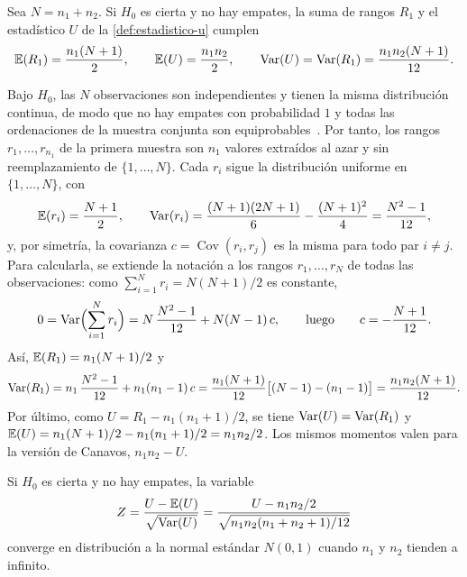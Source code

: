 \begin{proposicion}\label{prop:u-momentos}
Sea $N = n_1 + n_2$. Si $H_0$ es cierta y no hay empates, la suma de rangos $R_1$ y el estadístico $U$ de la \cref{def:estadistico-u} cumplen
\[
  \operatorname{\mathbb{E}}(R_1) = \frac{n_1 (N + 1)}{2}, \qquad
  \operatorname{\mathbb{E}}(U) = \frac{n_1 n_2}{2}, \qquad
  \operatorname{Var}(U) = \operatorname{Var}(R_1) = \frac{n_1 n_2 (N + 1)}{12}.
\]
\end{proposicion}
\begin{demostracion}
Bajo $H_0$, las $N$ observaciones son independientes y tienen la misma distribución continua, de modo que no hay empates con probabilidad $1$ y todas las ordenaciones de la muestra conjunta son equiprobables~\cite[sec.~15.2.1]{canavos2003}. Por tanto, los rangos $r_1, \dots, r_{n_1}$ de la primera muestra son $n_1$ valores extraídos al azar y sin reemplazamiento de $\{1, \dots, N\}$. Cada $r_i$ sigue la distribución uniforme en $\{1, \dots, N\}$, con
\[
  \operatorname{\mathbb{E}}(r_i) = \frac{N + 1}{2}, \qquad
  \operatorname{Var}(r_i) = \frac{(N + 1)(2N + 1)}{6} - \frac{(N + 1)^2}{4} = \frac{N^2 - 1}{12},
\]
y, por simetría, la covarianza $c = \operatorname{Cov}(r_i, r_j)$ es la misma para todo par $i \neq j$. Para calcularla, se extiende la notación a los rangos $r_1, \dots, r_N$ de todas las observaciones: como $\sum_{i=1}^{N} r_i = N(N+1)/2$ es constante,
\[
  0 = \operatorname{Var}\Bigl(\sum_{i=1}^{N} r_i\Bigr) = N\,\frac{N^2 - 1}{12} + N(N - 1)\,c,
  \qquad\text{luego}\qquad c = -\frac{N + 1}{12}.
\]
Así, $\operatorname{\mathbb{E}}(R_1) = n_1 (N+1)/2$ y
\[
  \operatorname{Var}(R_1) = n_1\,\frac{N^2 - 1}{12} + n_1(n_1 - 1)\,c
  = \frac{n_1 (N + 1)}{12}\bigl[(N - 1) - (n_1 - 1)\bigr]
  = \frac{n_1 n_2 (N + 1)}{12}.
\]
Por último, como $U = R_1 - n_1(n_1 + 1)/2$, se tiene $\operatorname{Var}(U) = \operatorname{Var}(R_1)$ y
$\operatorname{\mathbb{E}}(U) = n_1(N + 1)/2 - n_1(n_1 + 1)/2 = n_1 n_2 / 2$. Los mismos momentos valen para la versión de Canavos, $n_1 n_2 - U$.
\end{demostracion}

\begin{teorema}\label{teo:u-normal}
Si $H_0$ es cierta y no hay empates, la variable
\[
  Z = \frac{U - \operatorname{\mathbb{E}}(U)}{\sqrt{\operatorname{Var}(U)}} = \frac{U - n_1 n_2 / 2}{\sqrt{n_1 n_2 (n_1 + n_2 + 1)/12}}
\]
converge en distribución a la normal estándar $N(0, 1)$ cuando $n_1$ y $n_2$ tienden a infinito.
\end{teorema}

